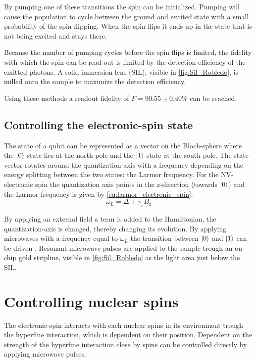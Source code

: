By pumping one of these transitions the spin can be initialized.
Pumping will cause the population to cycle between the ground and excited state with a small probability of the spin flipping.
When the spin flips it ends up in the state that is not being excited and stays there.

Because the number of pumping cycles before the spin flips is limited, the fidelity with which the spin can be read-out is limited by the detection efficiency of the emitted photons.
A solid immersion lens (SIL), visible in \cref{fig:Sil_Robledo}, is milled onto the sample to maximize the detection efficiency.

Using these methods a readout fidelity of $F= 90.55 \pm 0.40 \%$ can be reached.

\subsection{Controlling the electronic-spin state}
The state of a qubit can be represented as a vector on the Bloch-sphere where the ${\left\vert{0}\right\rangle}$-state lies at the north pole and the ${\left\vert{1}\right\rangle}$-state at the south pole.
The state vector rotates around the quantization-axis with a frequency depending on the energy splitting between the two states: the Larmor frequency.
For the NV-electronic spin the quantization axis points in the z-direction (towards ${\left\vert{0}\right\rangle}$) and the  Larmor frequency is given by \cref{eq:larmor_electronic_spin}:
\begin{equation}
    \omega_L =\Delta + \gamma_e {B_\mathrm{z}}
    \label{eq:larmor_electronic_spin}
\end{equation}


By applying an external field a term is added to the Hamiltonian, the quantization-axis is changed, thereby changing its evolution.
By applying microwaves with a frequency equal to $\omega_L$ the transition between ${\left\vert{0}\right\rangle}$ and ${\left\vert{1}\right\rangle}$ can be driven \citep{Jelezko2004Observation}.
Resonant microwave pulses are applied to the sample trough an on-chip gold stripline, visible in \cref{fig:Sil_Robledo} as the light area just below the SIL.

\section{Controlling nuclear spins}
The electronic-spin interacts with each nuclear spins in its environment trough the hyperfine interaction, which is dependent on their position.
Dependent on the strength of the hyperfine interaction close by spins can be controlled directly by applying microwave pulses.

